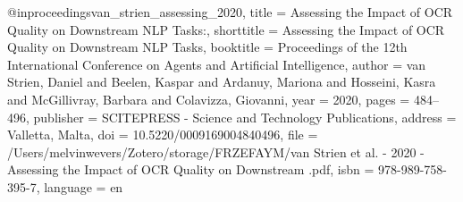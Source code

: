 
@inproceedings{van_strien_assessing_2020,
  title = {Assessing the {{Impact}} of {{OCR Quality}} on {{Downstream NLP Tasks}}:},
  shorttitle = {Assessing the {{Impact}} of {{OCR Quality}} on {{Downstream NLP Tasks}}},
  booktitle = {Proceedings of the 12th {{International Conference}} on {{Agents}} and {{Artificial Intelligence}}},
  author = {{van Strien}, Daniel and Beelen, Kaspar and Ardanuy, Mariona and Hosseini, Kasra and McGillivray, Barbara and Colavizza, Giovanni},
  year = {2020},
  pages = {484--496},
  publisher = {{SCITEPRESS - Science and Technology Publications}},
  address = {{Valletta, Malta}},
  doi = {10.5220/0009169004840496},
  file = {/Users/melvinwevers/Zotero/storage/FRZEFAYM/van Strien et al. - 2020 - Assessing the Impact of OCR Quality on Downstream .pdf},
  isbn = {978-989-758-395-7},
  language = {en}
}


